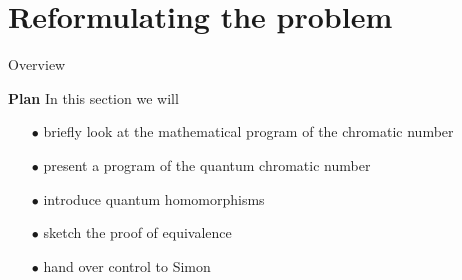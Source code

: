 \documentclass[13.5pt]{beamer}
\begin{document}
 
 
 
 
 
 
 
 
 
 
 
 
 
 
\begin{comment}
\begin{frame}{Quantum healing test slide.}
\centering
\fryingpan[12]\par
\hspace{2.5cm} nice ingredients\\ \hspace{2.5cm} super healthy\\ \hspace{2.5cm} no GMOs \\ \vspace{0.3cm} \hspace{2.5cm}  $\xdownarrow{0.5cm}$ \\ \vspace{0.3cm} \hspace{2.5cm} \textbf{application:} quantum healing
\end{frame}
\end{comment} 




\section{Reformulating the problem}
\begin{frame}{Overview}
\begin{block}{\color{colorblue}\textbf{Plan}}
In this section we will 
\begin{itemize}
\item[$\bullet$] briefly look at the mathematical program of the chromatic number \pause
\item[$\bullet$] present a program of the quantum chromatic number \pause
\item[$\bullet$] introduce quantum homomorphisms \pause
\item[$\bullet$] sketch the proof of equivalence \pause
\item[$\bullet$] hand over control to Simon
\end{itemize}
\end{block}
\end{frame}
\end{document}
